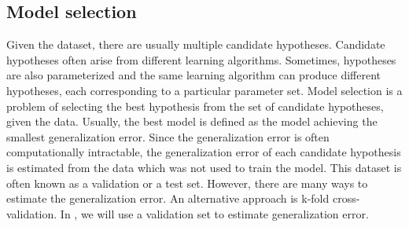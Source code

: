 \subsection{Model selection}
Given the dataset, there are usually multiple candidate hypotheses. Candidate hypotheses often arise from different learning algorithms. Sometimes, hypotheses are also parameterized and the same learning algorithm can produce different hypotheses, each corresponding to a particular parameter set. 
Model selection is a problem of selecting the best hypothesis from the set of candidate hypotheses, given the data. Usually, the best model is defined as the model achieving the smallest generalization error. Since the generalization error is often computationally intractable, the generalization error of each candidate hypothesis is estimated from the data which was not used to train the model. This dataset is often known as a validation or a test set. However, there are many ways to estimate the generalization error. An alternative approach is k-fold cross-validation. \newpage In , we will use a validation set to estimate generalization error.